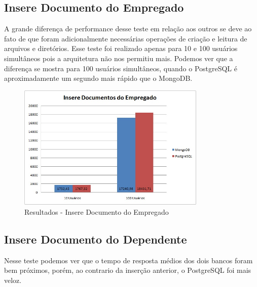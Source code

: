 \subsection{Insere Documento do Empregado}

A grande diferença de performance desse teste em relação aos outros se deve ao fato de que foram adicionalmente necessárias operações de criação e leitura de arquivos e diretórios. Esse teste foi realizado apenas para 10 e 100 usuários simultâneos pois a arquitetura não nos permitiu mais. Podemos ver que a diferença se mostra para 100 usuários simultâneos, quando o PostgreSQL é aproximadamente um segundo mais rápido que o MongoDB.

\begin{figure}[!htbp]
	\begin{center}
		\includegraphics[width=0.8\textwidth]{resultados/insere_doc_empregado}
	\end{center}
	\caption{Resultados - Insere Documento do Empregado}
	\label{fig:resultinseredocempregado}
\end{figure}

\subsection{Insere Documento do Dependente}

Nesse teste podemos ver que o tempo de resposta médios dos dois bancos foram bem próximos, porém, ao contrario da inserção anterior, o PostgreSQL foi mais veloz.

